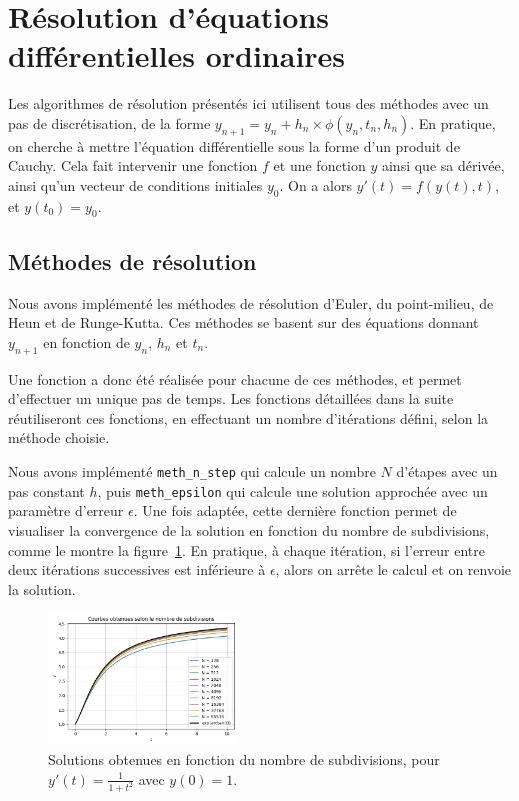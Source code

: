 \section{Résolution d'équations différentielles ordinaires}\label{sec:sec1}
Les algorithmes de résolution présentés ici utilisent tous des méthodes avec un pas de discrétisation, de la forme
$y_{n+1}=y_n+h_n \times \phi (y_n,t_n,h_n)$. En pratique, on cherche à mettre l'équation différentielle sous la forme d'un produit de Cauchy.
Cela fait intervenir une fonction $f$ et une fonction $y$ ainsi que sa dérivée, ainsi qu'un vecteur de conditions initiales $y_0$.
On a alors $y'(t)=f(y(t),t)$, et $y(t_0)=y_0$.

\subsection{Méthodes de résolution}
Nous avons implémenté les méthodes de résolution d’Euler, du point-milieu, de Heun et de Runge-Kutta.
Ces méthodes se basent sur des équations donnant $y_{n+1}$ en fonction de $y_n$, $h_n$ et $t_n$.

Une fonction a donc été réalisée pour chacune de ces méthodes, et permet d'effectuer un unique pas de temps.
Les fonctions détaillées dans la suite réutiliseront ces fonctions, en effectuant un nombre d'itérations défini, selon la méthode choisie.

Nous avons implémenté \texttt{meth\_n\_step} qui calcule un nombre $N$ d'étapes avec un pas constant $h$,
puis \texttt{meth\_epsilon} qui calcule une solution approchée avec un paramètre d’erreur $\epsilon$.
Une fois adaptée, cette dernière fonction permet de visualiser la convergence de la solution en fonction du nombre de subdivisions,
comme le montre la figure~\ref{fig:subdivision}.
En pratique, à chaque itération, si l'erreur entre deux itérations successives est inférieure à $\epsilon$,
alors on arrête le calcul et on renvoie la solution.

\begin{figure}[htbp!]
	\centering
	\includegraphics[width=0.45\textwidth]{res/subdivisions}
	\caption{Solutions obtenues en fonction du nombre de subdivisions, pour $y'(t) = \frac{1}{1 + t^2}$ avec $y(0) = 1$.}
	\label{fig:subdivision}
\end{figure}


